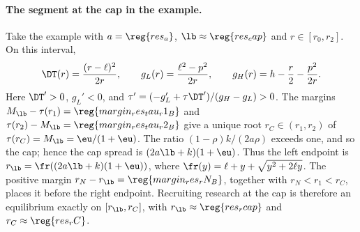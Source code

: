 \paragraph{The segment at the cap in the example.}
Take the example with \(a=\reg{res_a}\), \(\lb\approx\reg{res_cap}\) and \(r\in[r_0,r_2]\). On this interval,
\[
 \DT(r)=\frac{(r-\ell)^2}{2r},\qquad
 g_L(r)=\frac{\ell^2-p^2}{2r},\qquad
 g_H(r)=h-\frac r2-\frac{p^2}{2r}.
\]
Here \(\DT'>0\), \(g_L'<0\), and
\(\tau'=(-g_L'+\tau\DT')/(g_H-g_L)>0\). The margins
\(M_{\lb}-\tau(r_1)=\reg{margin_res_tau_r1_B}\) and
\(\tau(r_2)-M_{\lb}=\reg{margin_res_tau_r2_B}\) give a unique root
\(r_C\in(r_1,r_2)\) of \(\tau(r_C)=M_{\lb}=\eu/(1+\eu)\).
The ratio \((1-\rho)k/(2a\rho)\) exceeds one, and so the cap; hence
the cap spread is \((2a\lb+k)(1+\eu)\). Thus the left endpoint is
\(r_{\lb}=\fr((2a\lb+k)(1+\eu))\), where
\(\fr(y)=\ell+y+\sqrt{y^2+2\ell y}\).
The positive margin \(r_N-r_{\lb}=\reg{margin_res_rN_B}\), together with \(r_N<r_1<r_C\), places it before the
right endpoint. Recruiting research at the cap is therefore an equilibrium exactly on
\([r_{\lb},r_C]\), with \(r_{\lb}\approx\reg{res_rcap}\) and \(r_C\approx\reg{res_rC}\).
